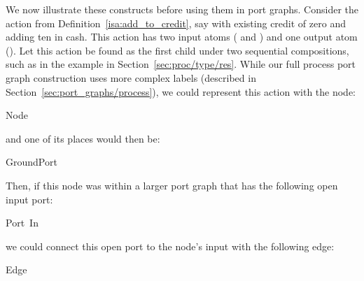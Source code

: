 \documentclass[class=smolathesis,crop=false]{standalone}
\begin{document}
We now illustrate these constructs before using them in port graphs.
\cbstart
Consider the  action from Definition~\ref{isa:add_to_credit}, say with existing credit of zero and adding ten in cash.
This action has two input atoms ( and ) and one output atom ().
Let this action be found as the first child under two sequential compositions, such as in the example in Section~\ref{sec:proc/type/res}.
While our full process port graph construction uses more complex labels (described in Section~\ref{sec:port_graphs/process}), we could represent this action with the node:
\begin{center}
  \begin{minipage}{0.75\textwidth}
    \begin{isabelle}
      Node\ \isanewline
      \isanewline
    \end{isabelle}
  \end{minipage}
\end{center}
and one of its places would then be:
\begin{isabelle}
\centering
  GroundPort\ 
\end{isabelle}
Then, if this node was within a larger port graph that has the following open input port:
\begin{isabelle}
\centering
  Port\ In\ \ 
\end{isabelle}
we could connect this open port to the node's input with the following edge:
\begin{isabelle}
\centering
  Edge\ \isanewline
\end{isabelle}
\cbend
\end{document}
